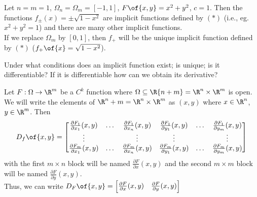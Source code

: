\begin{example}
    Let $n = m = 1$, $\Omega_n = \Omega_m = [-1, 1]$, $F\of{x,y} = x^2 + y^2$, $c = 1$. Then the functions $f_\pm (x) = \pm\sqrt{1 - x^2}$ are implicit functions defined by $(*)$ (i.e., eg. $x^2 + y^2 = 1$) and there are many other implicit functions. \\
    If we replace $\Omega_m$ by $[0,1]$, then $f_+$ will be the unique implicit function defined by $(*)$ ($f_+\of{x} = \sqrt{1 - x^2}$).
\end{example}

\begin{question}
    Under what conditions does an implicit function exist; is unique; is it differentiable? If it is differentiable how can we obtain its derivative?
\end{question}

\begin{note}
    Let $F: \Omega \to \R^m$ be a $C^k$ function where $\Omega \subseteq \R{n + m} = \R^n \times \R^m$ is open. We will write the elements of $\R^n + m = \R^n \times \R^m$ as $(x,y)$ where $x \in \R^n$, $y \in \R^m$. Then
    $$D_f\of{x,y} = \begin{bmatrix}
        \frac{\partial F_1}{\partial x_1}(x,y) & \dots & \frac{\partial F_1}{\partial x_n}(x,y) & \frac{\partial F_1}{\partial y_1}(x,y) & \dots & \frac{\partial F_1}{\partial y_m}(x,y) \\
        \vdots & & \vdots & \vdots & & \vdots \\
        \frac{\partial F_m}{\partial x_1}(x,y) & \dots & \frac{\partial F_m}{\partial x_n}(x,y) & \frac{\partial F_m}{\partial y_1}(x,y) & \dots & \frac{\partial F_m}{\partial y_m}(x,y)
    \end{bmatrix}$$ with the first $m \times n$ block will be named $\frac{\partial F}{\partial x}(x,y)$ and the second $m \times m$ block will be named $\frac{\partial F}{\partial y}(x,y)$. \\
    Thus, we can write $D_F\of{x,y} = \begin{bmatrix} \frac{\partial F}{\partial x}(x,y) & \frac{\partial F}{\partial y}(x,y) \end{bmatrix}$
\end{note}

